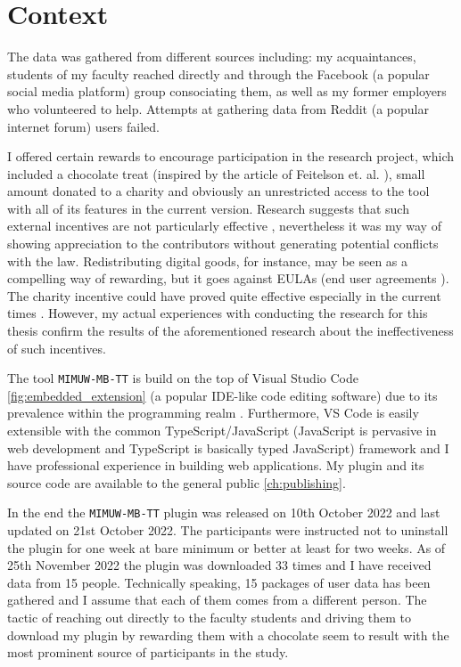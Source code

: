 \section{Context}\label{sec:context}

The data was gathered from different sources including: my acquaintances, students of my faculty reached directly and through the Facebook (a popular social media platform) group consociating them, as well as my former employers who volunteered to help. Attempts at gathering data from Reddit (a popular internet forum) users failed.

I offered certain rewards to encourage participation in the research project, which included a chocolate treat (inspired by the article of Feitelson et. al. \cite{Fei22DeveloperNames}), small amount donated to a charity and obviously an unrestricted access to the tool with all of its features in the current version. Research suggests that such external incentives are not particularly effective \cite{Coh19AltruisticSurvey, Bru11DifferentMotivations}, nevertheless it was my way of showing appreciation to the contributors without generating potential conflicts with the law. Redistributing digital goods, for instance, may be seen as a compelling way of rewarding, but it goes against EULAs (end user agreements \cite{EULA}). The charity incentive could have proved quite effective especially in the current times \cite{Forbes22Philanthropy}. However, my actual experiences with conducting the research for this thesis confirm the results of the aforementioned research about the ineffectiveness of such incentives.

The tool \texttt{MIMUW-MB-TT} is build on the top of Visual Studio Code \ref{fig:embedded_extension} (a popular IDE-like code editing software) due to its prevalence within the programming realm \cite{StackOverflow22Survey}. Furthermore, VS Code is easily extensible with the common TypeScript/JavaScript (JavaScript is pervasive in web development and TypeScript is basically typed JavaScript) framework and I have professional experience in building web applications. My plugin and its source code are available to the general public \ref{ch:publishing}.

In the end the \texttt{MIMUW-MB-TT} plugin was released on 10th October 2022 and last updated on 21st October 2022. The participants were instructed not to uninstall the plugin for one week at bare minimum or better at least for two weeks. As of 25th November 2022 the plugin was downloaded 33 times and I have received data from 15 people. Technically speaking, 15 packages of user data has been gathered and I assume that each of them comes from a different person. The tactic of reaching out directly to the faculty students and driving them to download my plugin by rewarding them with a chocolate seem to result with the most prominent source of participants in the study.

